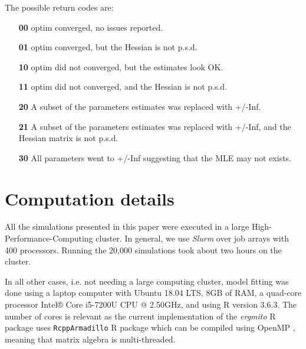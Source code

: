 \documentclass[review, nonatbib,doubleblind]{elsarticle/elsarticle}
\begin{document}
The possible return codes are:

\begin{itemize}
\item[\textbf{00}] optim converged, no issues reported.
\item[\textbf{01}] optim converged, but the Hessian is not p.s.d.
\item[\textbf{10}] optim did not converged, but the estimates look OK.
\item[\textbf{11}] optim did not converged, and the Hessian is not p.s.d.
\item[\textbf{20}] A subset of the parameters estimates was replaced with +/-Inf.
\item[\textbf{21}] A subset of the parameters estimates was replaced with +/-Inf, and the Hessian matrix is not p.s.d.
\item[\textbf{30}] All parameters went to +/-Inf suggesting that the MLE may not exists.
\end{itemize}

\section{Computation details \label{sec:computing-details}}

All the simulations presented in this paper were executed in a large High-Performance-Computing cluster. In general, we use \textit{Slurm} \cite{Jette02slurm} over job arrays with 400 processors. Running the 20,000 simulations took about two hours on the cluster. 

In all other cases, i.e. not needing a large computing cluster, model fitting was done using a laptop computer with Ubuntu 18.04 LTS, 8GB of RAM, a quad-core processor Intel® Core i5-7200U CPU @ 2.50GHz, and using R version 3.6.3. The number of cores is relevant as the current implementation of the \textit{ergmito} R package uses \texttt{RcppArmadillo} R package \cite{Eddelbuettel2014} which can be compiled using OpenMP \cite{dagum1998openmp}, meaning that matrix algebra is multi-threaded.
\end{document}

